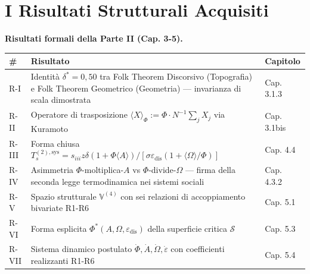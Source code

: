 \section{I Risultati Strutturali
Acquisiti}\label{i-risultati-strutturali-acquisiti}

\Proved{} \textbf{Risultati formali della Parte II (Cap. 3-5).}

{\def\LTcaptype{none} %
{\small\begin{longtable}[]{@{}
  >{\raggedright\arraybackslash}p{}
  >{\raggedright\arraybackslash}p{}
  >{\raggedright\arraybackslash}p{}@{}}
\toprule\noalign{}
\begin{minipage}[b]{\linewidth}\raggedright
\#
\end{minipage} & \begin{minipage}[b]{\linewidth}\raggedright
Risultato
\end{minipage} & \begin{minipage}[b]{\linewidth}\raggedright
Capitolo
\end{minipage} \\
\midrule\noalign{}
\endhead
\bottomrule\noalign{}
\endlastfoot
R-I & Identità \(\delta^* = 0{,}50\) tra Folk Theorem Discorsivo
(Topografia) e Folk Theorem Geometrico (Geometria) --- invarianza di
scala dimostrata & Cap. 3.1.3 \\
R-II & Operatore di trasposizione
\(\langle X \rangle_\Phi := \Phi \cdot N^{-1}\sum_j X_j\) via Kuramoto &
Cap. 3.1bis \\
R-III & Forma chiusa
\(T_s^{(2),\text{sys}} = s_{iii} z \delta (1+\Phi\langle A\rangle) / [\sigma \varepsilon_{\text{dis}} (1 + \langle\Omega\rangle/\Phi)]\)
& Cap. 4.4 \\
R-IV & Asimmetria \(\Phi\)-moltiplica-\(A\) vs
\(\Phi\)-divide-\(\Omega\) --- firma della seconda legge termodinamica
nei sistemi sociali & Cap. 4.3.2 \\
R-V & Spazio strutturale \(\mathbb{V}^{(4)}\) con sei relazioni di
accoppiamento bivariate R1-R6 & Cap. 5.1 \\
R-VI & Forma esplicita \(\Phi^*(A, \Omega, \varepsilon_{\text{dis}})\)
della superficie critica \(\mathcal{S}\) & Cap. 5.3 \\
R-VII & Sistema dinamico postulato
\(\dot\Phi, \dot A, \dot\Omega, \dot\varepsilon\) con coefficienti
realizzanti R1-R6 & Cap. 5.4 \\
\end{longtable}}
}

